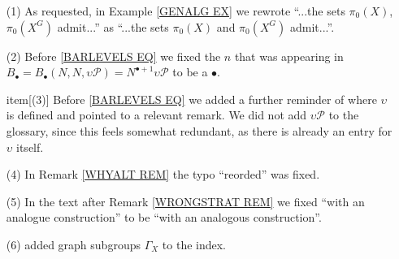 \documentclass{article}
\begin{document}
\begin{itemize}

\item[(1)] As requested, in Example \ref{GENALG EX} we rewrote ``...the sets $\pi_0(X)$, $\pi_0(X^G)$ admit...'' as ``...the sets $\pi_0(X)$ and $\pi_0(X^G)$ admit...''.

\item[(2)] Before \eqref{BARLEVELS EQ} we
fixed the $n$ that was appearing in $B_{\bullet} = 
B_{\bullet}(N,N,\upsilon \mathcal{P})
= N^{\bullet+1} \upsilon \mathcal{P}$
to be a $\bullet$.

item[(3)] Before \eqref{BARLEVELS EQ} we added a further reminder of where $\upsilon$ is defined and pointed to a relevant remark. We did not add $\upsilon \mathcal{P}$ to the glossary, since this feels somewhat redundant, as there is already an entry for $\upsilon$ itself.


\item[(4)] In Remark \ref{WHYALT REM} the typo ``reorded'' was fixed.

\item[(5)]
In the text after Remark \ref{WRONGSTRAT REM} we fixed
``with an analogue construction'' to be 
``with an analogous construction''.

\item[(6)] added graph subgroups $\Gamma_X$ to the index. %

        
\end{itemize}










\end{document}
